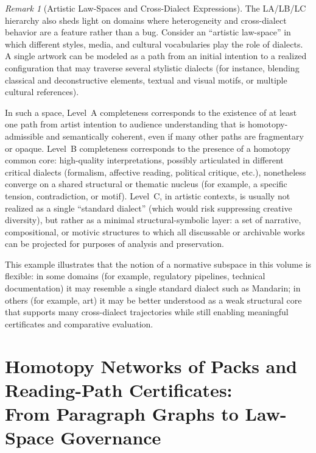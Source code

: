 \documentclass[11pt]{book}
\theoremstyle{plain}
\theoremstyle{definition}
\theoremstyle{remark}
\newtheorem{remark}[theorem]{Remark}
\begin{document}
\begin{remark}[Artistic Law-Spaces and Cross-Dialect Expressions]
\label{rem:artistic-law-spaces-cross-dialects}
The LA/LB/LC hierarchy also sheds light on domains where heterogeneity and
cross-dialect behavior are a feature rather than a bug. Consider an
``artistic law-space'' in which different styles, media, and cultural
vocabularies play the role of dialects. A single artwork can be modeled as a
path from an initial intention to a realized configuration that may traverse
several stylistic dialects (for instance, blending classical and deconstructive
elements, textual and visual motifs, or multiple cultural references).

In such a space, Level~A completeness corresponds to the existence of at least
one path from artist intention to audience understanding that is
homotopy-admissible and semantically coherent, even if many other paths are
fragmentary or opaque. Level~B completeness corresponds to the presence of a
homotopy common core: high-quality interpretations, possibly articulated in
different critical dialects (formalism, affective reading, political critique,
etc.), nonetheless converge on a shared structural or thematic nucleus (for
example, a specific tension, contradiction, or motif). Level~C, in artistic
contexts, is usually not realized as a single ``standard dialect'' (which would
risk suppressing creative diversity), but rather as a minimal
structural-symbolic layer: a set of narrative, compositional, or motivic
structures to which all discussable or archivable works can be projected for
purposes of analysis and preservation.

This example illustrates that the notion of a normative subspace in this volume
is flexible: in some domains (for example, regulatory pipelines, technical
documentation) it may resemble a single standard dialect such as Mandarin; in
others (for example, art) it may be better understood as a weak structural core
that supports many cross-dialect trajectories while still enabling meaningful
certificates and comparative evaluation.
\end{remark}



\chapter[Homotopy Networks of Packs and Reading-Path Certificates]{Homotopy Networks of Packs and Reading-Path Certificates:\\
         From Paragraph Graphs to Law-Space Governance}
\end{document}
